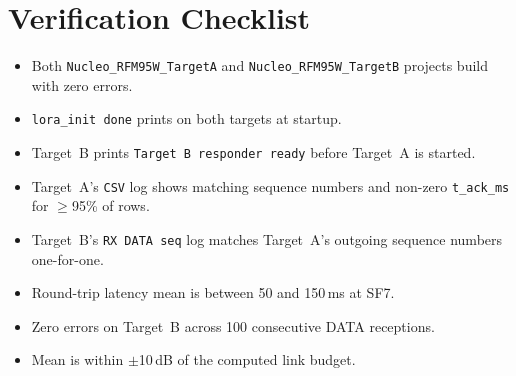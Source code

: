 \documentclass[11pt,letterpaper]{article}
\begin{document}

\newpage
\section{Verification Checklist}
\begin{itemize}[leftmargin=2em]
	\item[$\square$] Both \texttt{Nucleo\_RFM95W\_TargetA} and \texttt{Nucleo\_RFM95W\_TargetB} projects build with zero errors.
	\item[$\square$] \texttt{lora\_init done} prints on both targets at startup.
	\item[$\square$] Target~B prints \texttt{Target B responder ready} before Target~A is started.
	\item[$\square$] Target~A's \texttt{CSV} log shows matching sequence numbers and non-zero \texttt{t\_ack\_ms} for $\geq$95\% of rows.
	\item[$\square$] Target~B's \texttt{RX DATA seq} log matches Target~A's outgoing sequence numbers one-for-one.
	\item[$\square$] Round-trip latency mean is between 50 and 150\,ms at SF7.
	\item[$\square$] Zero \CRC{} errors on Target~B across 100 consecutive DATA receptions.
	\item[$\square$] Mean \RSSI{} is within $\pm$10\,dB of the computed link budget.
\end{itemize}
\end{document}
